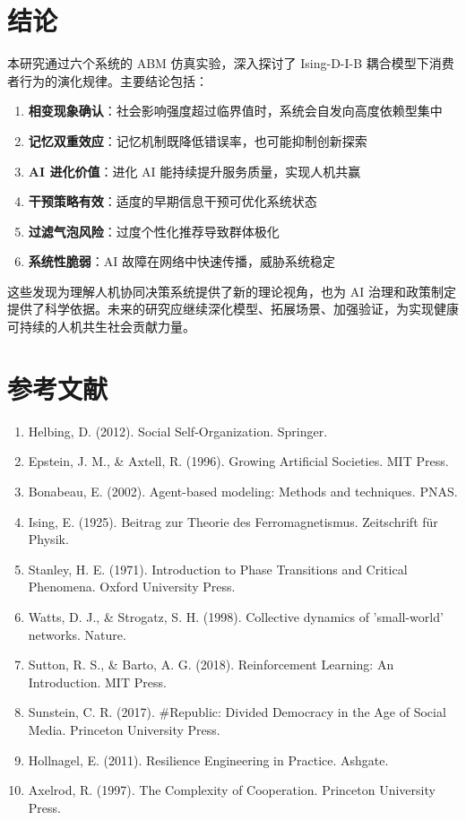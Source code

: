 \documentclass[a4paper,12pt]{article}
\begin{document}
\section{结论}

本研究通过六个系统的 ABM 仿真实验，深入探讨了 Ising-D-I-B 耦合模型下消费者行为的演化规律。主要结论包括：

\begin{enumerate}
    \item \textbf{相变现象确认}：社会影响强度超过临界值时，系统会自发向高度依赖型集中
    
    \item \textbf{记忆双重效应}：记忆机制既降低错误率，也可能抑制创新探索
    
    \item \textbf{AI 进化价值}：进化 AI 能持续提升服务质量，实现人机共赢
    
    \item \textbf{干预策略有效}：适度的早期信息干预可优化系统状态
    
    \item \textbf{过滤气泡风险}：过度个性化推荐导致群体极化
    
    \item \textbf{系统性脆弱}：AI 故障在网络中快速传播，威胁系统稳定
\end{enumerate}

这些发现为理解人机协同决策系统提供了新的理论视角，也为 AI 治理和政策制定提供了科学依据。未来的研究应继续深化模型、拓展场景、加强验证，为实现健康可持续的人机共生社会贡献力量。

\newpage
\section*{参考文献}

\begin{enumerate}
    \item Helbing, D. (2012). Social Self-Organization. Springer.
    \item Epstein, J. M., \& Axtell, R. (1996). Growing Artificial Societies. MIT Press.
    \item Bonabeau, E. (2002). Agent-based modeling: Methods and techniques. PNAS.
    \item Ising, E. (1925). Beitrag zur Theorie des Ferromagnetismus. Zeitschrift für Physik.
    \item Stanley, H. E. (1971). Introduction to Phase Transitions and Critical Phenomena. Oxford University Press.
    \item Watts, D. J., \& Strogatz, S. H. (1998). Collective dynamics of 'small-world' networks. Nature.
    \item Sutton, R. S., \& Barto, A. G. (2018). Reinforcement Learning: An Introduction. MIT Press.
    \item Sunstein, C. R. (2017). \#Republic: Divided Democracy in the Age of Social Media. Princeton University Press.
    \item Hollnagel, E. (2011). Resilience Engineering in Practice. Ashgate.
    \item Axelrod, R. (1997). The Complexity of Cooperation. Princeton University Press.
\end{enumerate}
\end{document}
